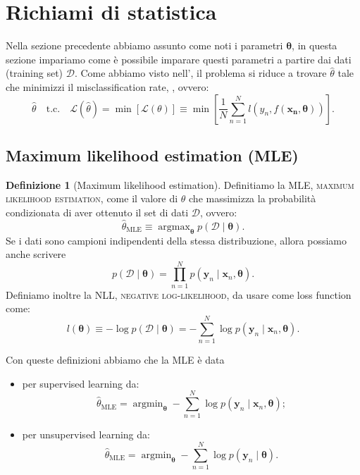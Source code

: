 \documentclass[10pt]{article}
\DeclareMathOperator*{\argmax}{argmax}
\DeclareMathOperator*{\argmin}{argmin}
\newcommand{\ve}[1]{\bm{#1}}
\newcommand{\im}[1]{\textsc{#1}}
\newcommand{\cond}{\mid}
\newcommand{\pare}[1]{
	\ensuremath{\left(#1\right)}
}
\newcommand{\spare}[1]{
	\ensuremath{\left[#1\right]}
}
\theoremstyle{definition}
\newtheorem{definition}{Definizione}[section]
\begin{document}
\section{Richiami di statistica}
Nella sezione precedente abbiamo assunto come noti i parametri $\ve{\theta}$,
in questa sezione impariamo come è possibile imparare questi parametri a partire
dai dati (training set) $\mathcal{D}$. Come abbiamo visto nell',
il problema si riduce a trovare $\hat{\theta}$ tale che minimizzi il
misclassification rate, , ovvero:
\[
\hat{\theta} \quad\text{t.c.}\quad \mathcal{L}(\hat{\theta}) = \min\spare{\mathcal{L}\pare{\theta}} \equiv \min\spare{\frac{1}{N}\sum_{n=1}^N l\pare{y_n, f\pare{\ve{x_n}, \ve{\theta}}}}.
\]

\subsection{Maximum likelihood estimation (MLE)}
\begin{definition}[Maximum likelihood estimation]
Definitiamo la MLE, \im{maximum likelihood estimation}, come il valore di
$\theta$ che massimizza la probabilità condizionata di aver ottenuto il set di
dati $\mathcal{D}$, ovvero:
\begin{equation}
\hat{\theta}_{\text{MLE}} \equiv \argmax_{\ve{\theta}} p\pare{\mathcal{D}\cond\ve{\theta}}.
\end{equation}
Se i dati sono campioni indipendenti della stessa distribuzione, allora possiamo anche scrivere
\begin{equation}
p\pare{\mathcal{D}\cond\ve{\theta}} = \prod_{n=1}^N p\pare{\ve{y}_n \cond \ve{x}_n, \ve{\theta}}.
\end{equation}
Definiamo inoltre la NLL, \textsc{negative log-likelihood}, da usare come loss function come:
\begin{equation}
l\pare{\ve{\theta}} \equiv -\log p\pare{\mathcal{D}\cond\ve{\theta}} = -\sum_{n=1}^N \log p\pare{\ve{y}_n \cond \ve{x}_n , \ve{\theta}}.
\end{equation}
\end{definition}

Con queste definizioni abbiamo che la MLE è data
\begin{itemize}
\item per supervised learning da:
\begin{equation}
\hat{\theta}_{\text{MLE}} = \argmin_{\ve{\theta}} -\sum_{n=1}^N \log p\pare{\ve{y}_n \cond \ve{x}_n, \ve{\theta}};
\end{equation}
\item per unsupervised learning da:
\begin{equation}
\hat{\theta}_{\text{MLE}} = \argmin_{\ve{\theta}} -\sum_{n=1}^N \log p\pare{\ve{y}_n \cond \ve{\theta}}.
\end{equation}
\end{itemize}
\end{document}
